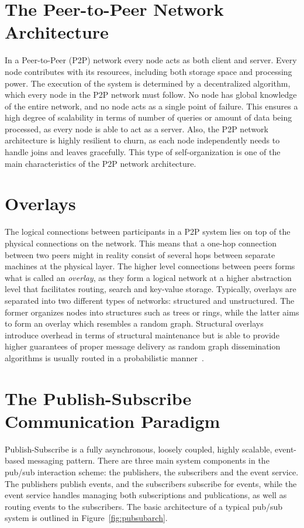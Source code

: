 \section{The Peer-to-Peer Network Architecture}
In a Peer-to-Peer (P2P) network every node acts as both client and
server. Every node contributes with its resources, including both
storage space and processing power. The execution of the system is
determined by a decentralized algorithm, which every node in the P2P
network must follow. No node has global knowledge of the entire network,
and no node acts as a single point of failure. This ensures a high
degree of scalability in terms of number of queries or amount of data
being processed, as every node is able to act as a server. Also, the P2P
network architecture is highly resilient to churn, as each node
independently needs to handle joins and leaves gracefully. This type of
self-organization is one of the main characteristics of the P2P network
architecture.

\section{Overlays}
The logical connections between participants in a P2P
system lies on top of the physical connections on the network. This
means that a one-hop connection between two peers might in reality
consist of several hops between separate machines at the physical layer.
The higher level connections between peers forms what is called an
\emph{overlay}, as they form a logical network at a higher abstraction
level that facilitates routing, search and key-value storage. Typically,
overlays are separated into two different types of networks: structured
and unstructured. The former organizes nodes into structures such as
trees or rings, while the latter aims to form an overlay which resembles
a random graph. Structural overlays introduce overhead in terms of
structural maintenance but is able to provide higher guarantees of
proper message delivery as random graph dissemination algorithms is
usually routed in a probabilistic manner~\cite{Wong:2008}.

\section{The Publish-Subscribe Communication Paradigm}

Publish-Subscribe is a fully asynchronous, loosely coupled,
highly scalable, event-based messaging pattern. There are three main
system components in the pub/sub interaction scheme: the publishers, the
subscribers and the event service. The publishers publish events, and
the subscribers subscribe for events, while the event service handles
managing both subscriptions and publications, as well as routing events
to the subscribers. The basic architecture of a typical pub/sub system
is outlined in Figure~\ref{fig:pubsubarch}.

